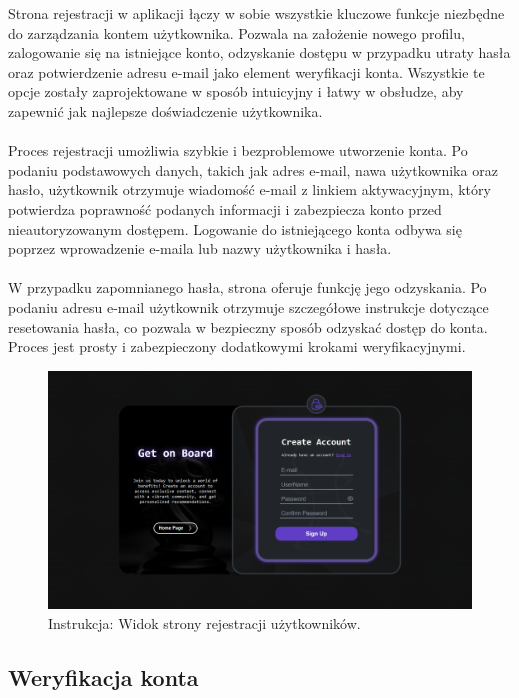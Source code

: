 \documentclass[twoside]{projektInzynierskiMS1}
\begin{document}
\noindent
Strona rejestracji w aplikacji łączy w sobie wszystkie kluczowe funkcje niezbędne do zarządzania kontem użytkownika. Pozwala na założenie nowego profilu, zalogowanie się na istniejące konto, odzyskanie dostępu w przypadku utraty hasła oraz potwierdzenie adresu e-mail jako element weryfikacji konta. Wszystkie te opcje zostały zaprojektowane w sposób intuicyjny i łatwy w obsłudze, aby zapewnić jak najlepsze doświadczenie użytkownika.
\\\\
Proces rejestracji umożliwia szybkie i bezproblemowe utworzenie konta. Po podaniu podstawowych danych, takich jak adres e-mail, nawa użytkownika oraz hasło, użytkownik otrzymuje wiadomość e-mail z linkiem aktywacyjnym, który potwierdza poprawność podanych informacji i zabezpiecza konto przed nieautoryzowanym dostępem. Logowanie do istniejącego konta odbywa się poprzez wprowadzenie e-maila lub nazwy użytkownika i hasła.
\\\\
W przypadku zapomnianego hasła, strona oferuje funkcję jego odzyskania. Po podaniu adresu e-mail użytkownik otrzymuje szczegółowe instrukcje dotyczące resetowania hasła, co pozwala w bezpieczny sposób odzyskać dostęp do konta. Proces jest prosty i zabezpieczony dodatkowymi krokami weryfikacyjnymi.

\vspace{0.5cm}
\begin{figure}[h!]
    \centering
    \includegraphics[width=1\textwidth]{images/ins_reg.png}
    \caption{Instrukcja: Widok strony rejestracji użytkowników.}
\end{figure}
\vspace{0.5cm}

\newpage

\subsection{Weryfikacja konta}
\end{document}
